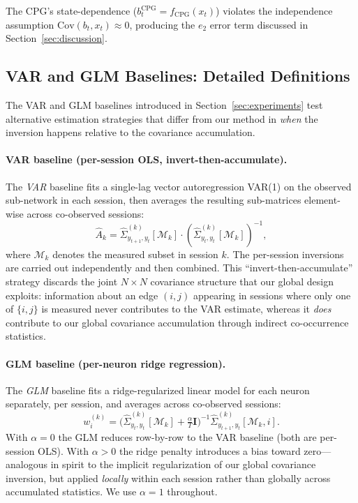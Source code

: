 \documentclass{article}
\begin{document}
The CPG's state-dependence ($b^{\mathrm{CPG}}_t = f_{\mathrm{CPG}}(x_t)$) violates the independence assumption $\mathrm{Cov}(b_t,x_t)\approx 0$, producing the $e_2$ error term discussed in Section~\ref{sec:discussion}.

\subsection{VAR and GLM Baselines: Detailed Definitions}
\label{sec:app_baselines}

The VAR and GLM baselines introduced in Section~\ref{sec:experiments} test alternative estimation strategies that differ from our method in \emph{when} the inversion happens relative to the covariance accumulation.

\paragraph{VAR baseline (per-session OLS, invert-then-accumulate).}
The \emph{VAR} baseline fits a single-lag vector autoregression VAR(1) on the observed sub-network in each session, then averages the resulting sub-matrices element-wise across co-observed sessions:
\begin{equation}
\hat{A}_k = \hat{\Sigma}^{(k)}_{y_{t+1},y_t}[\mathcal{M}_k] \cdot \left(\hat{\Sigma}^{(k)}_{y_t,y_t}[\mathcal{M}_k]\right)^{-1},
\end{equation}
where $\mathcal{M}_k$ denotes the measured subset in session $k$. The per-session inversions are carried out independently and then combined. This ``invert-then-accumulate'' strategy discards the joint $N \times N$ covariance structure that our global design exploits: information about an edge $(i,j)$ appearing in sessions where only one of $\{i,j\}$ is measured never contributes to the VAR estimate, whereas it \emph{does} contribute to our global covariance accumulation through indirect co-occurrence statistics.

\paragraph{GLM baseline (per-neuron ridge regression).}
The \emph{GLM} baseline fits a ridge-regularized linear model for each neuron separately, per session, and averages across co-observed sessions:
\begin{equation}
w_i^{(k)} = \bigl(\hat{\Sigma}^{(k)}_{y_t,y_t}[\mathcal{M}_k] + \tfrac{\alpha}{T}\mathbf{I}\bigr)^{-1} \hat{\Sigma}^{(k)}_{y_{t+1},y_t}[\mathcal{M}_k,i].
\end{equation}
With $\alpha = 0$ the GLM reduces row-by-row to the VAR baseline (both are per-session OLS). With $\alpha > 0$ the ridge penalty introduces a bias toward zero---analogous in spirit to the implicit regularization of our global covariance inversion, but applied \emph{locally} within each session rather than globally across accumulated statistics. We use $\alpha = 1$ throughout.
\end{document}
